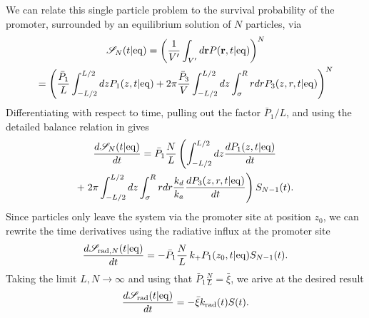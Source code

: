 We can relate this single particle problem to the survival probability of the promoter, surrounded by an equilibrium solution of $N$ particles, via \cite{Szabo1989} 
\begin{gather}
 \mathscr{S}_{N}(t|{\rm eq}) = \left( \frac{1}{V'} \int_{V'} d{\bf r} P({\bf r}, t|{\rm eq})\right)^N \\ 
 = \left( \frac{\bar{P}_1}{L} \int_{-L/2}^{L/2}dz P_1(z,t|{\rm eq }) + 2\pi \frac{\bar{P}_3}{V} \int_{-L/2}^{L/2}dz \int_{\sigma}^{R}rdr P_3(z,r,t|{\rm eq}) \right)^N
\end{gather}
Differentiating with respect to time, pulling out the factor $\bar{P}_1/L$, and using the detailed balance relation in  gives
\begin{multline}
 \frac{d\mathscr{S}_{N}(t|{\rm eq})}{dt} = \bar{P}_1 \frac{N}{L} \left( \int_{-L/2}^{L/2}dz  \frac{dP_1(z,t|{\rm eq})}{dt} \right. \\ +  \left. 2\pi \int_{-L/2}^{L/2}dz \int_{\sigma}^{R}rdr \frac{k_d}{k_a} \frac{dP_3(z,r,t|{\rm eq})}{dt} \right) S_{N-1}(t).
\end{multline}
Since particles only leave the system via the promoter site at position $z_0$, we can rewrite the time derivatives using the radiative influx at the promoter site
\begin{equation}
 \frac{d\mathscr{S}_{{\rm rad}, N}(t|{\rm eq})}{dt} = -\bar{P}_1 \frac{N}{L} \, k_+ P_1(z_0,t|{\rm eq}) S_{N-1}(t).
\end{equation}
Taking the limit $L,N \to \infty$ and using that $\bar{P}_1 \frac{N}{L} = \bar{\xi}$, we arive at the desired result
\begin{equation}
 \frac{d\mathscr{S}_{{\rm rad}}(t|{\rm eq})}{dt} = - \bar{\xi} k_{\rm rad}(t) S(t).
\end{equation}













